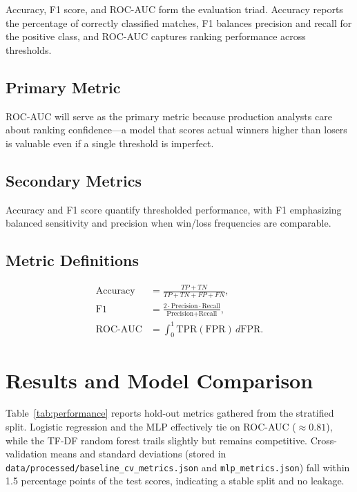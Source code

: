 \documentclass[aps,prl,preprint,groupedaddress]{revtex4-2}
\begin{document}
Accuracy, F1 score, and ROC-AUC form the evaluation triad. Accuracy reports the percentage of correctly classified matches, F1 balances precision and recall for the positive class, and ROC-AUC captures ranking performance across thresholds.

\subsection{Primary Metric}
ROC-AUC will serve as the primary metric because production analysts care about ranking confidence---a model that scores actual winners higher than losers is valuable even if a single threshold is imperfect.

\subsection{Secondary Metrics}
Accuracy and F1 score quantify thresholded performance, with F1 emphasizing balanced sensitivity and precision when win/loss frequencies are comparable.

\subsection{Metric Definitions}
\begin{align}
\text{Accuracy} &= \frac{TP + TN}{TP + TN + FP + FN},\\
\text{F1} &= \frac{2 \cdot \text{Precision} \cdot \text{Recall}}{\text{Precision} + \text{Recall}},\\
\text{ROC-AUC} &= \int_{0}^{1} \text{TPR}(\text{FPR})\,d\text{FPR}.
\end{align}

\section{Results and Model Comparison}
\label{sec:results}

Table~\ref{tab:performance} reports hold-out metrics gathered from the stratified split. Logistic regression and the MLP effectively tie on ROC-AUC ($\approx0.81$), while the TF-DF random forest trails slightly but remains competitive. Cross-validation means and standard deviations (stored in \texttt{data/processed/baseline\_cv\_metrics.json} and \texttt{mlp\_metrics.json}) fall within 1.5 percentage points of the test scores, indicating a stable split and no leakage.
\end{document}
